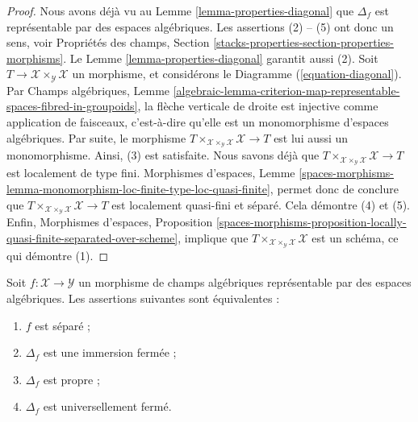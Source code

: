 \begin{proof}
Nous avons déjà vu au Lemme \ref{lemma-properties-diagonal} que $\Delta_f$
est représentable par des espaces algébriques. Les assertions (2) -- (5) ont
donc un sens, voir Propriétés des champs,
Section \ref{stacks-properties-section-properties-morphisms}. Le Lemme
\ref{lemma-properties-diagonal} garantit aussi (2). Soit
$T\to\mathcal{X}\times_\mathcal{Y}\mathcal{X}$ un morphisme, et considérons
le Diagramme (\ref{equation-diagonal}). Par Champs algébriques, Lemme
\ref{algebraic-lemma-criterion-map-representable-spaces-fibred-in-groupoids},
la flèche verticale de droite est injective comme application de faisceaux,
c'est-à-dire qu'elle est un monomorphisme d'espaces algébriques. Par suite, le
morphisme
$T\times_{\mathcal{X}\times_\mathcal{Y}\mathcal{X}}\mathcal{X}\to T$
est lui aussi un monomorphisme. Ainsi, (3) est satisfaite. Nous savons déjà que
$T\times_{\mathcal{X}\times_\mathcal{Y}\mathcal{X}}\mathcal{X}\to T$ est
localement de type fini. Morphismes d'espaces, Lemme
\ref{spaces-morphisms-lemma-monomorphism-loc-finite-type-loc-quasi-finite},
permet donc de conclure que
$T\times_{\mathcal{X}\times_\mathcal{Y}\mathcal{X}}\mathcal{X}\to T$
est localement quasi-fini et séparé.
Cela démontre (4) et (5). Enfin, Morphismes d'espaces, Proposition
\ref{spaces-morphisms-proposition-locally-quasi-finite-separated-over-scheme},
implique que
$T\times_{\mathcal{X}\times_\mathcal{Y}\mathcal{X}}\mathcal{X}$ est un
schéma, ce qui démontre (1).
\end{proof}

\begin{lemma}
\label{lemma-representable-separated-diagonal-closed}
Soit $f:\mathcal{X}\to\mathcal{Y}$ un morphisme de champs algébriques
représentable par des espaces algébriques. Les assertions suivantes sont
équivalentes :
\begin{enumerate}
\item $f$ est séparé ;
\item $\Delta_f$ est une immersion fermée ;
\item $\Delta_f$ est propre ;
\item $\Delta_f$ est universellement fermé.
\end{enumerate}
\end{lemma}

